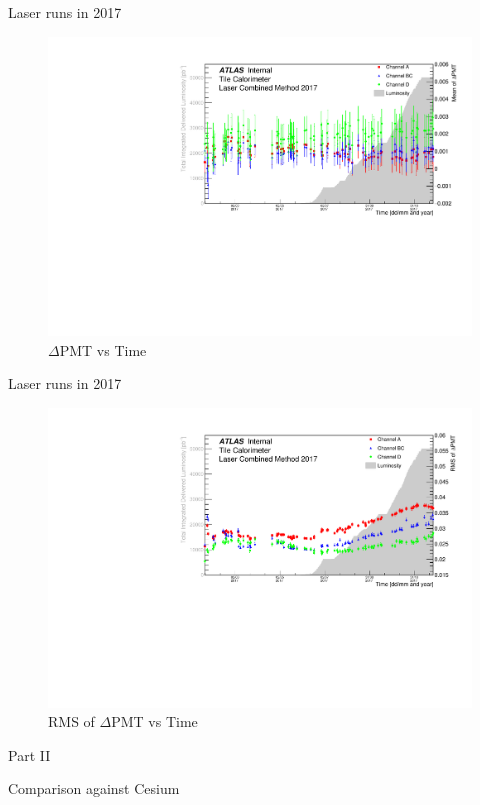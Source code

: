 \documentclass{beamer}
\begin{document}
\begin{frame}{Laser runs in 2017}{}
\begin{figure}
\centering
\includegraphics[width=\textwidth]{pmtm17.pdf}
\caption{$\Delta$PMT vs Time}
\end{figure}
\end{frame}

\begin{frame}{Laser runs in 2017}{}
\begin{figure}
\centering
\includegraphics[width=\textwidth]{pmtr17.pdf}
\caption{RMS of $\Delta$PMT vs Time}
\end{figure}
\end{frame}



\begin{frame}{Part II}
\begin{center}\color{red}\Huge{Comparison against Cesium}\end{center}
\end{frame}
\end{document}
